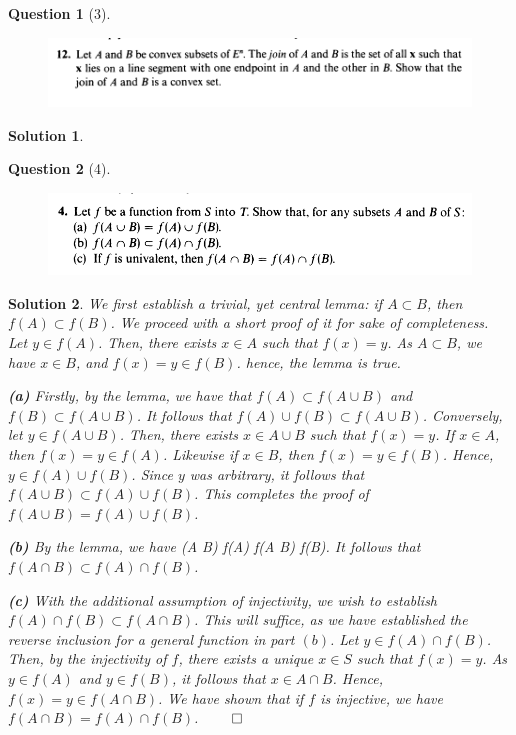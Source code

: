 \documentclass{article} %
\def\eQb#1\eQe{\begin{eqnarray*}#1\end{eqnarray*}}
\theoremstyle{quest}
\newtheorem*{question}{Question}
\newtheorem*{solution}{Solution}
\begin{document}
\newpage

\begin{question}[3]
\hfill
\begin{figure}[h!]
  \centering
    \includegraphics[width=1\textwidth]{MV-1-5-12.png}
\end{figure}
\end{question}
\begin{solution}
\end{solution}

\newpage

\begin{question}[4]
\hfill
\begin{figure}[h!]
  \centering
    \includegraphics[width=1\textwidth]{MV-2-1-4.png}
\end{figure}
\end{question}
\begin{solution}
We first establish a trivial, yet central lemma: if $A \subset B$, then $f(A) \subset f(B)$.
We proceed with a short proof of it for sake of completeness.  
Let $y \in f(A)$. Then, there exists $x \in A$ such that $f(x) = y$. As $A \subset B$, 
we have $x \in B$, and $f(x) = y \in f(B)$. hence, the lemma is true.

\textbf{(a)}
Firstly, by the lemma, we have that $f(A) \subset f(A \cup B)$ and $f(B) \subset f(A \cup B)$.
It follows that $f(A) \cup f(B) \subset f(A \cup B)$. Conversely, 
let $y \in f(A \cup B)$. Then, there exists $x \in A \cup B$ such that $f(x) = y$. 
If $x \in A$, then $f(x) = y \in f(A)$. Likewise if $x \in B$, then $f(x) = y \in f(B)$. Hence,
$y \in f(A) \cup f(B)$. Since $y$ was arbitrary, it follows that $f(A \cup B) \subset 
f(A) \cup f(B)$. 
This completes
the proof of $f(A \cup B) = f(A) \cup f(B)$.  

\bigskip

\textbf{(b)} By the lemma, we have
\eQb
f(A \cap B) \subset f(A) \> \>  \> \> f(A \cap B) \subset f(B).
\eQe 
It follows that $f(A \cap B) \subset f(A) \cap f(B)$. 

\bigskip

\textbf{(c)} With the additional assumption of injectivity, we wish to establish 
$f(A) \cap f(B) \subset  f(A \cap B)$. This will suffice, as we have established the reverse
inclusion for a general function in part $(b)$. Let $y \in f(A) \cap f(B)$. Then, by the
injectivity of $f$, there exists a unique $x \in S$ such that $f(x) = y$. As $y \in f(A)$ and
$y \in f(B)$, it follows that $x \in A \cap B$. Hence, $f(x) = y \in f(A \cap B)$. We have shown 
that if $f$ is injective, we have $f(A \cap B)  = f(A) \cap f(B)$.
\hfill $\qed$ 
   
  
\end{solution}
\end{document}
